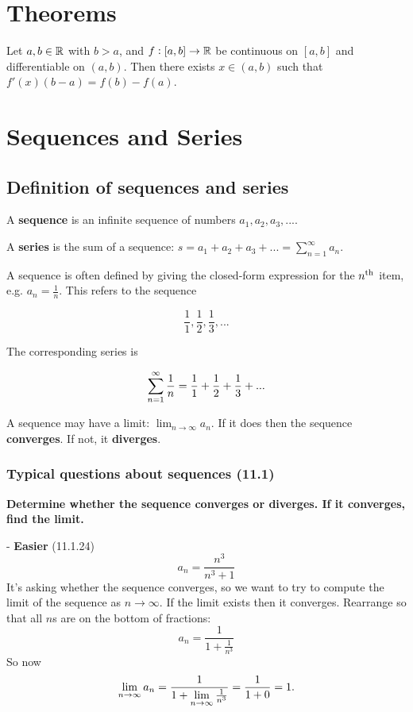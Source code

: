 \section{Theorems}

\begin{theorem*}
  Let $a, b \in \mathbb{R}$ with $b > a$, and $f:[a,b] \to \mathbb{R}$ be continuous on $[a, b]$ and differentiable
  on $(a, b)$. Then there exists $x \in (a, b)$ such that $f'(x)(b - a) = f(b) - f(a)$.
\end{theorem*}


\section{Sequences and Series}

\subsection{Definition of sequences and series}

A \textbf{sequence} is an infinite sequence of numbers $a_1, a_2, a_3, ...$.

A \textbf{series} is the sum of a sequence: $s = a_1 + a_2 + a_3 + ... = \sum_{n=1}^\infty a_n$.

A sequence is often defined by giving the closed-form expression for the $n^{\text{th}}$ item, e.g. $a_n = \frac{1}{n}$. This refers to the sequence

$$\frac{1}{1}, \frac{1}{2}, \frac{1}{3}, ...$$

The corresponding series is

$$
\sum_{n=1}^{\infty} \frac{1}{n} = \frac{1}{1} + \frac{1}{2} + \frac{1}{3} + ...
$$

A sequence may have a limit: $\lim_{n \rightarrow \infty} a_n$. If it does then the sequence \textbf{converges}. If not, it \textbf{diverges}.

\subsubsection{Typical questions about sequences (11.1)}


\textbf{Determine whether the sequence converges or diverges. If it converges, find the limit.}

- \textbf{Easier} (11.1.24)
  $$
  a_n = \frac{n^3}{n^3 + 1}
  $$
  It's asking whether the sequence converges, so we want to try to compute the limit of the sequence as $n \rightarrow \infty$. If the limit exists then it converges. Rearrange so that all $n$s are on the bottom of fractions:
  $$
  a_n = \frac{1}{1 + \frac{1}{n^3}}
  $$
  So now
  $$
  \lim\limits_{n \to \infty} a_n = \frac{1}{1 + \lim\limits_{n \to \infty}\frac{1}{n^3}} = \frac{1}{1 + 0} = 1.
  $$

